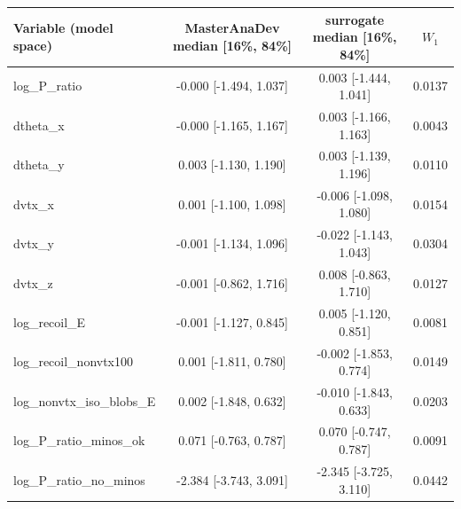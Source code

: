 \begin{tabular}{lccc}
\toprule
Variable (model space) & MasterAnaDev median [16\%, 84\%] & surrogate median [16\%, 84\%] & $W_1$ \\
\midrule
log\_P\_ratio & -0.000 [-1.494, 1.037] & 0.003 [-1.444, 1.041] & 0.0137 \\
dtheta\_x & -0.000 [-1.165, 1.167] & 0.003 [-1.166, 1.163] & 0.0043 \\
dtheta\_y & 0.003 [-1.130, 1.190] & 0.003 [-1.139, 1.196] & 0.0110 \\
dvtx\_x & 0.001 [-1.100, 1.098] & -0.006 [-1.098, 1.080] & 0.0154 \\
dvtx\_y & -0.001 [-1.134, 1.096] & -0.022 [-1.143, 1.043] & 0.0304 \\
dvtx\_z & -0.001 [-0.862, 1.716] & 0.008 [-0.863, 1.710] & 0.0127 \\
log\_recoil\_E & -0.001 [-1.127, 0.845] & 0.005 [-1.120, 0.851] & 0.0081 \\
log\_recoil\_nonvtx100 & 0.001 [-1.811, 0.780] & -0.002 [-1.853, 0.774] & 0.0149 \\
log\_nonvtx\_iso\_blobs\_E & 0.002 [-1.848, 0.632] & -0.010 [-1.843, 0.633] & 0.0203 \\
log\_P\_ratio\_minos\_ok & 0.071 [-0.763, 0.787] & 0.070 [-0.747, 0.787] & 0.0091 \\
log\_P\_ratio\_no\_minos & -2.384 [-3.743, 3.091] & -2.345 [-3.725, 3.110] & 0.0442 \\
\bottomrule
\end{tabular}
